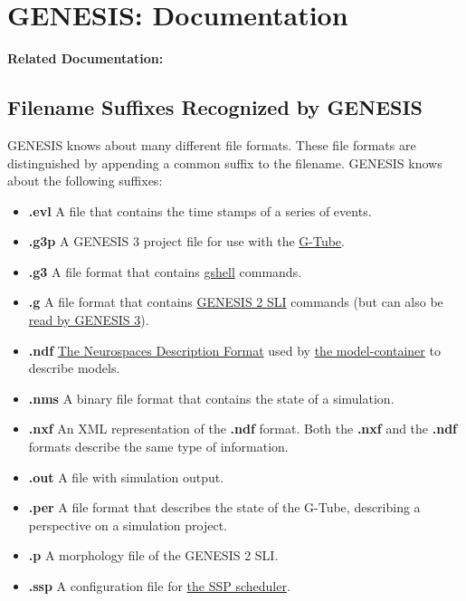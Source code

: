 \documentclass[12pt]{article}
\begin{document}
\section*{GENESIS: Documentation}

{\bf Related Documentation:}

\subsection*{Filename Suffixes Recognized by GENESIS}

GENESIS knows about many different file formats.  These file formats
are distinguished by appending a common suffix to the
filename.  GENESIS knows about the following suffixes:

\begin{itemize}

\item[]{\bf .evl} A file that contains the time stamps of a series of
  events.
\item[]{\bf .g3p} A GENESIS 3 project file for use with the
  \href{../g-tube/g-tube.tex}{G-Tube}.
\item[]{\bf .g3} A file format that contains
  \href{../gshell/gshell.tex}{gshell} commands.
\item[]{\bf .g} A file format that contains
  \href{http://genesis-sim.org/GENESIS/}{GENESIS 2 SLI} commands (but
  can also be
  \href{../backward-compatibility/backward-compatibility.tex}{read by
    GENESIS 3}).
\item[]{\bf .ndf} \href{../ndf-file-format/ndf-file-format.tex}{The
    Neurospaces Description Format} used by
  \href{../model-container/model-container.tex}{the model-container}
  to describe models.
\item[]{\bf .nms} A binary file format that contains the state of a
  simulation.
\item[]{\bf .nxf} An XML representation of the {\bf .ndf} format.
  Both the {\bf .nxf} and the {\bf .ndf} formats describe the same
  type of information.
\item[]{\bf .out} A file with simulation output.
\item[]{\bf .per} A file format that describes the state of the
  G-Tube, describing a perspective on a simulation project.
\item[]{\bf .p} A morphology file of the GENESIS 2 SLI.
\item[]{\bf .ssp} A configuration file for \href{../ssp/ssp.tex}{the
    SSP scheduler}.

\end{itemize}
\end{document}
